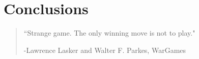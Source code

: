 \chapter{Conclusions}
\label{chap:Conclusions}



\begin{quotation}
	\vspace{-3cm}
    \begin{flushright}
    \begin{minipage}[t][5cm][b]{0.5\textwidth}
    { ``Strange game. The only winning move is not to play."}
    
    \bigskip
    
    -{\small  Lawrence Lasker and Walter F. Parkes, WarGames}
    \end{minipage}
    \end{flushright}
    
    \vspace{0.5cm}
\end{quotation}

